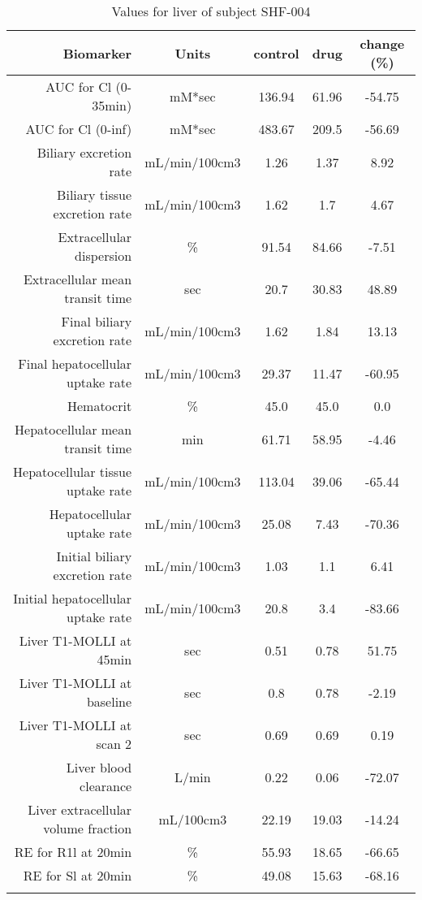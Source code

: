 \documentclass{epflreport}%
\begin{document}
%
\clearpage%
\begin{longtable}{rcccc}%
\hline%
Biomarker&Units&control&drug&change (\%)\\%
\hline%
AUC for Cl (0{-}35min)&mM*sec&136.94&61.96&{-}54.75\\%
AUC for Cl (0{-}inf)&mM*sec&483.67&209.5&{-}56.69\\%
Biliary excretion rate&mL/min/100cm3&1.26&1.37&8.92\\%
Biliary tissue excretion rate&mL/min/100cm3&1.62&1.7&4.67\\%
Extracellular dispersion&\%&91.54&84.66&{-}7.51\\%
Extracellular mean transit time&sec&20.7&30.83&48.89\\%
Final biliary excretion rate&mL/min/100cm3&1.62&1.84&13.13\\%
Final hepatocellular uptake rate&mL/min/100cm3&29.37&11.47&{-}60.95\\%
Hematocrit&\%&45.0&45.0&0.0\\%
Hepatocellular mean transit time&min&61.71&58.95&{-}4.46\\%
Hepatocellular tissue uptake rate&mL/min/100cm3&113.04&39.06&{-}65.44\\%
Hepatocellular uptake rate&mL/min/100cm3&25.08&7.43&{-}70.36\\%
Initial biliary excretion rate&mL/min/100cm3&1.03&1.1&6.41\\%
Initial hepatocellular uptake rate&mL/min/100cm3&20.8&3.4&{-}83.66\\%
Liver T1{-}MOLLI at 45min&sec&0.51&0.78&51.75\\%
Liver T1{-}MOLLI at baseline&sec&0.8&0.78&{-}2.19\\%
Liver T1{-}MOLLI at scan 2&sec&0.69&0.69&0.19\\%
Liver blood clearance&L/min&0.22&0.06&{-}72.07\\%
Liver extracellular volume fraction&mL/100cm3&22.19&19.03&{-}14.24\\%
RE for R1l at 20min&\%&55.93&18.65&{-}66.65\\%
RE for Sl at 20min&\%&49.08&15.63&{-}68.16\\%
\hline%
\caption{Values for liver of subject SHF-004} \\%
\end{longtable}%
\end{document}

